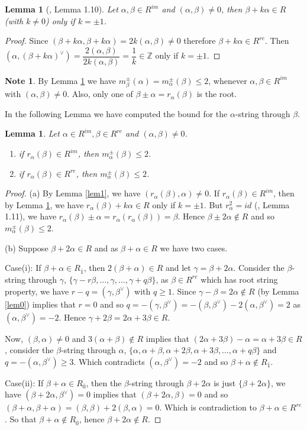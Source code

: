 \documentclass[11pt]{amsart}
\theoremstyle{plain}
\newtheorem{lemma}[thm]{Lemma}
\theoremstyle{definition}
\newtheorem{nt}[thm]{Note}
\numberwithin{equation}{section}
\newcommand{\al}{\alpha}
\newcommand{\be}{\beta}
\newcommand{\Z}{\mbox{$\mathbb Z$}}
\begin{document}
	\begin{lemma}[\cite{serganova1996generalizations}, Lemma 1.10]\label{lem3} Let $\al,\be\in R^{im}$ and $(\al,\be)\neq 0$, then $\be+k\al\in R$ (with $k\neq 0$) only if $k=\pm 1$.
	\end{lemma}
	\begin{proof} Since $(\be+k\al,\be+k\al)=2k(\al,\be)\neq 0$ therefore $\be+k\al\in R^{re}$. Then $(\al,(\be+k\al)^{\vee})=\dfrac{2(\al,\be)}{2k(\al,\be)}=\dfrac{1}{k}\in\Z$ only if $k=\pm 1$.
	\end{proof}
	\begin{nt}
		By Lemma \ref{lem3} we have $m_{\be}^\pm(\al)=m_{\al}^{\pm}(\be)\leq 2$, whenever $\al,\be\in R^{im}$ with $(\al,\be)\neq 0$. Also, only one of $\be\pm\al=r_{\al}(\be)$ is the root.
	\end{nt}
    In the following Lemma we have computed the bound for the $\alpha$-string through $\beta.$ 
\begin{lemma}\label{lem5} Let $\al\in R^{im},\be\in R^{re}$ and $(\al,\be)\neq0$. 
		\begin{enumerate}
			\item if $r_{\al}(\be)\in R^{im}$, then $m_{\al}^{\pm}(\be)\leq 2$.
			\item if $r_{\al}(\be)\in R^{re}$, then $m_{\al}^{\pm}(\be)\leq 2$.
		\end{enumerate}
	\end{lemma}
	\begin{proof} (a) By Lemma \ref{lem1}, we have $(r_{\al}(\be),\al)\neq0$. If $r_{\al}(\be)\in R^{im}$, then by Lemma \ref{lem3}, we have $r_{\al}(\be)+k\al\in R$ only if $k=\pm1$. But $r_{\al}^2=id$ (\cite{serganova1996generalizations}, Lemma 1.11), we have $r_{\al}(\be)\pm\al=r_{\al}(r_{\al}(\be))=\be$. Hence $\be\pm2\al\notin R$ and so  $m_{\al}^{\pm}(\be)\leq 2$.
		
		(b) Suppose $\be+2\al\in R$ and as $\be+\al\in R$ we have two cases.
		
		Case(i): If $\be+\al\in R_{\bar 1}$, then $2(\be+\al)\in R$ and let $\gamma=\be+2\al$. Consider the $\be$-string through $\gamma$, $\{\gamma-r\be,\ldots,\gamma,\ldots,\gamma+q\be\}$, as $\be\in R^{re}$ which has root string property, we have $r-q=(\gamma,\be^{\vee})$ with $q\geq1$. Since $\gamma-\be=2\al\notin R$ (by Lemma \ref{lem0}) implies that $r=0$ and so $q=-(\gamma,\be^{\vee})=-(\be,\be^{\vee})-2(\al,\be^{\vee})=2$ as $(\al,\be^{\vee})=-2$. Hence $\gamma+2\be=2\al+3\be\in R$.
		
		Now, $(\be,\al)\neq 0$ and $3(\al+\be)\notin R$ implies that $(2\al+3\be)-\al=\al+3\be\in R$, consider the $\be$-string through $\al$, $\{\al,\al+\be,\al+2\be,\al+3\be,\ldots,\al+q\be\}$ and $q=-(\al,\be^{\vee})\geq 3$. Which contradicts $(\al,\be^{\vee})=-2$ and so $\be+\al\notin R_{\bar 1}$.
		
		Case(ii): If $\be+\al\in R_{\bar 0}$, then the $\be$-string through $\be+2\al$ is just $\{\be+2\al\}$, we have $(\be+2\al,\be^{\vee})=0$ implies that $(\be+2\al,\be)=0$ and so $(\be+\al,\be+\al)=(\be,\be)+2(\be,\al)=0$. Which is contradiction to $\be+\al\in R^{re}$. So that $\be+\al\notin R_{\bar 0}$, hence $\be+2\al\notin R$.
	\end{proof}
	
\end{document}
